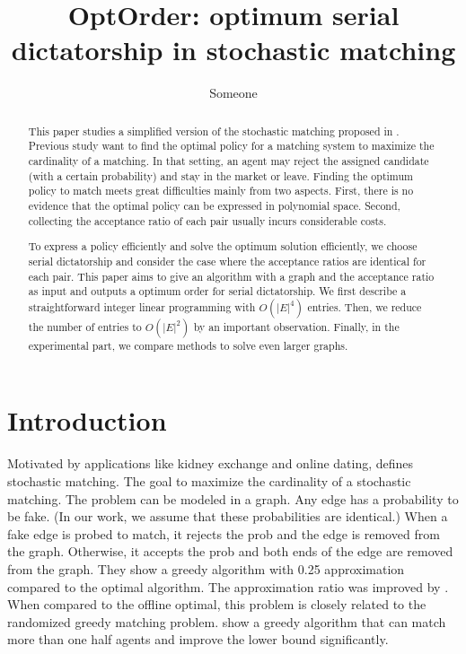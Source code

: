 \documentclass[letterpaper]{article}
\title {OptOrder: optimum serial dictatorship in stochastic matching}
\author {Someone}
\begin{document}
%

\maketitle
\begin{abstract}
This paper studies a simplified version of the stochastic matching proposed in \cite{chen2009approximating}.
Previous study want to find the optimal policy for a matching system to maximize the cardinality of a matching. 
In that setting, an agent may reject the assigned candidate (with a certain probability) and stay in the market or leave.
Finding the optimum policy to match meets great difficulties mainly from two aspects.
First, there is no evidence that the optimal policy can be expressed in polynomial space.
Second, collecting the acceptance ratio of each pair usually incurs considerable costs.

To express a policy efficiently and solve the optimum solution efficiently, we choose serial dictatorship and consider the case where the acceptance ratios are identical for each pair.
This paper aims to give an algorithm with a graph and the acceptance ratio as input and outputs a optimum order for serial dictatorship.
We first describe a straightforward integer linear programming with $O(|E|^4)$ entries.
Then, we reduce the number of entries to $O(|E|^2)$ by an important observation.
Finally, in the experimental part, we compare methods to solve even larger graphs.

\end{abstract}

\section{Introduction}

Motivated by applications like kidney exchange and online dating, \cite{chen2009approximating} defines stochastic matching.
The goal to maximize the cardinality of a stochastic matching.
The problem can be modeled in a graph.
Any edge has a probability to be fake. (In our work, we assume that these probabilities are identical.)
When a fake edge is probed to match, it rejects the prob and the edge is removed from the graph.
Otherwise, it accepts the prob and both ends of the edge are removed from the graph.
They show a greedy algorithm with 0.25 approximation compared to the optimal algorithm.
The approximation ratio was improved by \cite{adamczyk2011improved,costello2012stochastic}.
When compared to the offline optimal, this problem is closely related to the randomized greedy matching problem.
\cite{poloczek2012randomized,aronson1995randomized} show a greedy algorithm that can match more than one half agents and
\cite{goel2012matching} improve the lower bound significantly.
\end{document}
